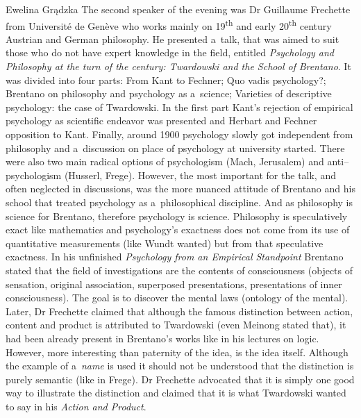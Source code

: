 \begin{editorialeng}{Ewelina Grądzka}
The second speaker of the evening was Dr Guillaume Frechette from Université de Genève who works mainly on 19\textsuperscript{th} and early 20\textsuperscript{th} century Austrian and German philosophy. He presented a~talk, that was aimed to suit those who do not have expert knowledge in the field, entitled \textit{Psychology and Philosophy at the turn of the century: Twardowski and the School of} \textit{Brentano}. It was divided into four parts: From Kant to Fechner; Quo vadis psychology?; Brentano on philosophy and psychology as a~science; Varieties of descriptive psychology: the case of Twardowski. In the first part Kant’s rejection of empirical psychology as scientific endeavor was presented and Herbart and Fechner opposition to Kant. Finally, around 1900 psychology slowly got independent from philosophy and a~discussion on place of psychology at university started. There were also two main radical options of psychologism (Mach, Jerusalem) and anti--psychologism (Husserl, Frege). However, the most important for the talk, and often neglected in discussions, was the more nuanced attitude of Brentano and his school that treated psychology as a~philosophical discipline. And as philosophy is science for Brentano, therefore psychology is science. Philosophy is speculatively exact like mathematics and psychology’s exactness does not come from its use of quantitative measurements (like Wundt wanted) but from that speculative exactness. In his unfinished \textit{Psychology from an Empirical Standpoint} Brentano stated that the field of investigations are the contents of consciousness (objects of sensation, original association, superposed presentations, presentations of inner consciousness). The goal is to discover the mental laws (ontology of the mental). Later, Dr Frechette claimed that although the famous distinction between action, content and product is attributed to Twardowski (even Meinong stated that), it had been already present in Brentano’s works like in his lectures on logic. However, more interesting than paternity of the idea, is the idea itself. Although the example of a~\textit{name} is used it should not be understood that the distinction is purely semantic (like in Frege). Dr Frechette advocated that it is simply one good way to illustrate the distinction and claimed that it is what Twardowski wanted to say in his \textit{Action and Product}.


\end{editorialeng}
